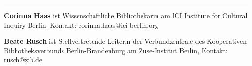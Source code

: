 \begin{center}\rule{3in}{0.4pt}\end{center}

\textbf{Corinna Haas} ist Wissenschaftliche Bibliothekarin am ICI
Institute for Cultural Inquiry Berlin, Kontakt:
corinna.haas@ici-berlin.org

\textbf{Beate Rusch} ist Stellvertretende Leiterin der Verbundzentrale
des Kooperativen Bibliotheksverbunds Berlin-Brandenburg am Zuse-Institut
Berlin, Kontakt: rusch@zib.de
